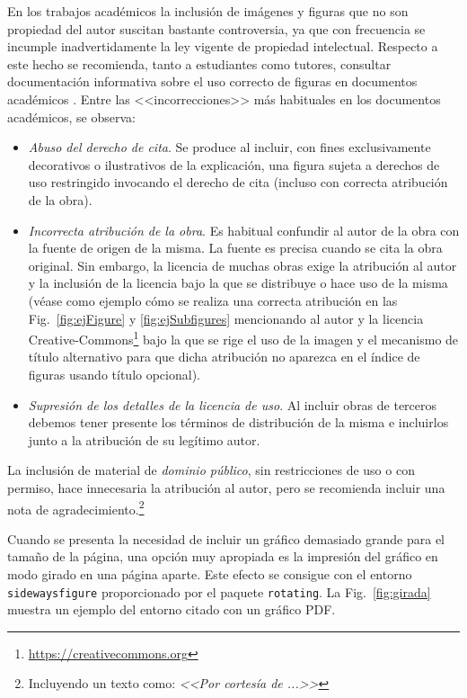 En los trabajos académicos la inclusión de imágenes y figuras que no son propiedad del autor suscitan bastante controversia, ya que con frecuencia se incumple inadvertidamente la ley vigente de propiedad intelectual. Respecto a este hecho se recomienda, tanto a estudiantes como tutores, consultar documentación informativa sobre el uso correcto de figuras en documentos académicos \cite{uclm20,unican18}. Entre las <<incorrecciones>> más habituales en los documentos académicos, se observa:
\begin{itemize}
\item \emph{Abuso del derecho de cita}. Se produce al incluir, con fines exclusivamente decorativos o ilustrativos de la explicación, una figura sujeta a derechos de uso restringido invocando el derecho de cita (incluso con correcta atribución de la obra).

\item \emph{Incorrecta atribución de la obra}. Es habitual confundir al autor de la obra con la fuente de origen de la misma. La fuente es precisa cuando se cita la obra original. Sin embargo, la licencia de muchas obras exige la atribución al autor y la inclusión de la licencia bajo la que se distribuye o hace uso de la misma (véase como ejemplo cómo se realiza una correcta atribución en las Fig.~\ref{fig:ejFigure} y \ref{fig:ejSubfigures} mencionando al autor y la licencia Creative-Commons\footnote{\url{https://creativecommons.org}} bajo la que se rige el uso de la imagen y el mecanismo de título alternativo para que dicha atribución no aparezca en el índice de figuras usando título opcional).

\item \emph{Supresión de los detalles de la licencia de uso}. Al incluir obras de terceros debemos tener presente los términos de distribución de la misma e incluirlos junto a la atribución de su legítimo autor.
\end{itemize}

La inclusión de material de \emph{dominio público}, sin restricciones de uso o con permiso, hace innecesaria la atribución al autor, pero se recomienda incluir una nota de agradecimiento.\footnote{Incluyendo un texto como: \emph{<<Por cortesía de ...>>}}

Cuando se presenta la necesidad de incluir un gráfico demasiado grande para el tamaño de la página, una opción muy apropiada es la impresión del gráfico en modo girado en una página aparte. Este efecto se consigue con el entorno \texttt{sidewaysfigure} proporcionado por el paquete \texttt{rotating}. La Fig.~\ref{fig:girada} muestra un ejemplo del entorno citado con un gráfico \textsf{PDF}.

